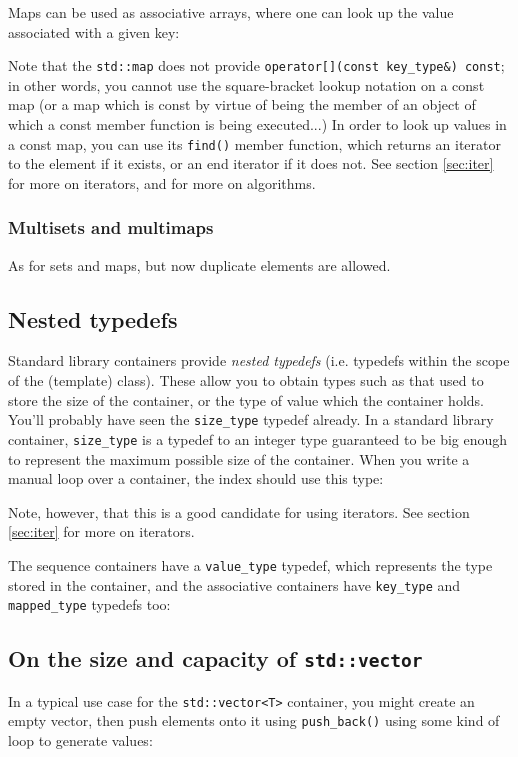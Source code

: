 \documentclass[a4paper]{scrartcl}
\begin{document}
Maps can be used as associative arrays, where one can look up the value associated with a given key:


Note that the \verb|std::map| does not provide \verb|operator[](const key_type&) const|; in other words, you cannot use the square-bracket lookup notation on a const map (or a map which is const by virtue of being the member of an object of which a const member function is being executed...) In order to look up values in a const map, you can use its \verb|find()| member function, which returns an iterator to the element if it exists, or an end iterator if it does not. See section \ref{sec:iter} for more on iterators, and\cite{StandardLibrary} for more on algorithms.



\subsubsection{Multisets and multimaps}\label{sec:containers_associative_multi}
As for sets and maps, but now duplicate elements are allowed.

\subsection{Nested typedefs}
Standard library containers provide \emph{nested typedefs} (i.e. typedefs within the scope of the (template) class). These allow you to obtain types such as that used to store the size of the container, or the type of value which the container holds. You'll probably have seen the \verb|size_type| typedef already. In a standard library container, \verb|size_type| is a typedef to an integer type guaranteed to be big enough to represent the maximum possible size of the container. When you write a manual loop over a container, the index should use this type:



Note, however, that this is a good candidate for using iterators. See section \ref{sec:iter} for more on iterators.

The sequence containers have a \verb|value_type| typedef, which represents the type stored in the container, and the associative containers have \verb|key_type| and \verb|mapped_type| typedefs too:



\subsection{On the size and capacity of \texttt{std::vector}}
In a typical use case for the \verb|std::vector<T>| container, you might create an empty vector, then push elements onto it using \verb|push_back()| using some kind of loop to generate values:
\end{document}
